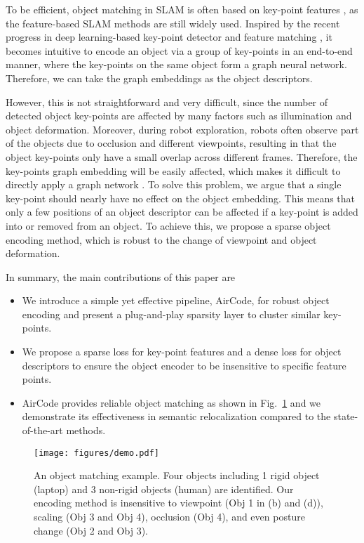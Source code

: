 \documentclass[letterpaper, 10 pt, journal, twoside]{IEEEtran}  %
\newcommand{\fref}[1]{Fig.~\ref{#1}}
\newcommand{\fix}[1]{#1}
\begin{document}
To be efficient, object matching in SLAM is often based on key-point features \cite{dubuisson1994modified}, as the feature-based SLAM methods \cite{mur2017orb} are still widely used.
Inspired by the recent progress in deep learning-based key-point detector \cite{detone2018superpoint} and feature matching \cite{sarlin2020superglue}, it becomes intuitive to encode an object via a group of key-points in an end-to-end manner, where the key-points on the same object form a graph neural network.
Therefore, we can take the graph embeddings as the object descriptors.

However, this is not straightforward and very difficult, since the number of detected object key-points are affected by many factors such as illumination and object deformation.
Moreover, during robot exploration, robots often observe part of the objects due to occlusion and different viewpoints, resulting in that the object key-points only have a small overlap across different frames.
Therefore, the key-points graph embedding will be easily affected, which makes it difficult to directly apply a graph network \cite{wang2020lifelong}.
To solve this problem, we argue that \fix{a single key-point should nearly have no effect on the object embedding}.
This means that only a few positions of an object descriptor can be affected if a key-point is added into or removed from an object.
To achieve this, we propose a sparse object encoding method, which is robust to the change of viewpoint and object deformation.

In summary, the main contributions of this paper are
\begin{itemize}
    \item We introduce a simple yet effective pipeline, AirCode, for robust object encoding and present a plug-and-play sparsity layer to cluster similar key-points.
    \item We propose a sparse loss for key-point features and a dense loss for object descriptors to ensure the object encoder to be insensitive to specific feature points.
    \item AirCode provides reliable object matching as shown in \fref{fig:demo} and we demonstrate its effectiveness in semantic relocalization compared to the state-of-the-art methods.
\end{itemize}


\begin{figure}[t]
    \centering
    \texttt{[image: figures/demo.pdf]}
    \caption{An object matching example. Four objects including 1 rigid object (laptop) and 3 non-rigid objects (human) are identified. Our encoding method is insensitive to viewpoint (Obj 1 in (b) and (d)), scaling (Obj 3 and Obj 4), occlusion (Obj 4), and even posture change (Obj 2 and Obj 3).}
    \label{fig:demo}
\end{figure}
\end{document}
